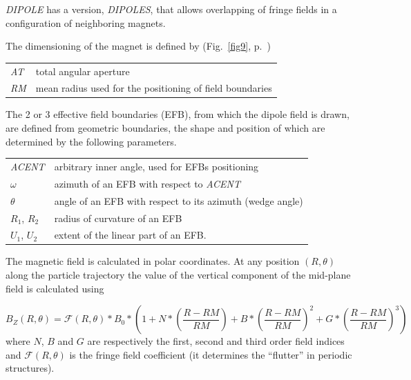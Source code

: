 \noindent \textsl{DIPOLE}  has a version, \textsl{DIPOLES}, that allows overlapping of fringe fields 
in a configuration of neighboring magnets. 

\bigskip

\noindent The dimensioning of the magnet is defined by (Fig.~\ref{fig9}, p.~\pageref{fig9})

\bigskip

 \begin{tabular}{>{\sl}l!{~:}l}
	 AT &  total angular aperture \\
	 RM & mean radius used for the positioning of field boundaries\\
 \end{tabular}

\bigskip

\noindent The 2 or 3 effective field boundaries (EFB), from which  the dipole field  is drawn, are
defined from geometric boundaries, the shape and position of which are determined by the 
following parameters. 

\bigskip

\begin{tabular}{l!{~:}l}
	 \textsl{ACENT} 
	    & arbitrary inner angle, used for EFBs positioning  \\
	$\omega$ &  azimuth of an EFB with respect to  \textsl{ACENT}\\
	$\theta$ & angle of an EFB with respect to its azimuth (wedge angle)\\ 
	$R_1$, $R_2$  &  radius of curvature of an EFB\\
	$U_1$, $U_2$  &  extent of the linear part of an EFB. 
\end{tabular}

\bigskip


 \noindent The magnetic field is calculated in  polar
coordinates. At  any position $(R,\theta)$ along the  particle trajectory 
the value of the vertical component of the mid-plane field is calculated using

 \begin{equation}
	 B_Z(R,\theta) =  \mathcal{F}(R,\theta) \ast  B_0 \ast  
	      \left(1+N \ast  
	           \left( \dfrac{R-RM }{ RM}\right) 
	           + B \ast  \left(\dfrac{R-RM }{ RM} \right)^2 
	           + G \ast  \left(\dfrac{R-RM }{ RM} \right)^3 
	      \right) 
 	\label{eqBDipole}
 \end{equation}
 where  $ N$, $B $ and $ G $ are  respectively  the first, second and
third order field indices and $ \mathcal{F}(R,\theta)$ is the fringe field coefficient (it determines the ``flutter'' 
in periodic structures). 


